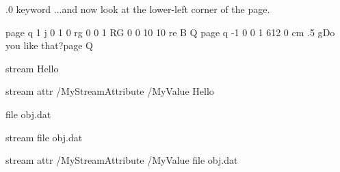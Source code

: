 .0 {\primitive{} keyword}
...and now look at the lower-left corner of the page.\par
\pdfliteral page {q 1 j 0 1 0 rg 0 0 1 RG 0 0 10 10 re B Q}
\pdfliteral page {q -1 0 0 1 612 0 cm .5 g}\hfill Do you like that?\pdfliteral page {Q}
\endfeature

\bigskip


\pdfrefobj \pdflastobj      %


\immediate \pdfobj stream   %
   {Hello}                  %

\pdfobj stream              %
    attr {/MyStreamAttribute /MyValue} %
    {Hello}
\pdfrefobj \pdflastobj

\pdfobj file {obj.dat}      %
\pdfrefobj \pdflastobj

\pdfobj stream              %
    file {obj.dat}
\pdfrefobj \pdflastobj

\pdfobj stream              %
    attr {/MyStreamAttribute /MyValue} %
    file {obj.dat}
\pdfrefobj \pdflastobj


